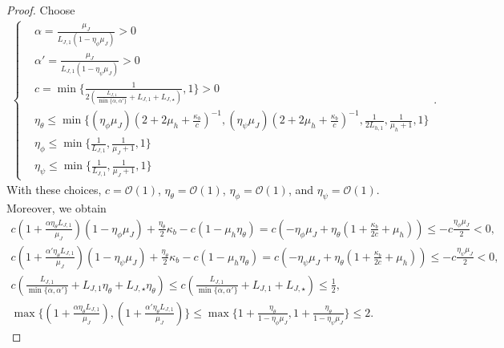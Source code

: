 \documentclass{article}
\theoremstyle{plain}
\theoremstyle{definition}
\theoremstyle{remark}
\def\cO{\mathcal O}
\begin{document}
\begin{proof}
    Choose
    \begin{align} 
        \begin{cases}
            & \alpha  = \frac{\mu_J}{L_{J,1}(1 - \eta_\phi \mu_J)} > 0  \\
            & \alpha' = \frac{\mu_J}{L_{J,1}(1 - \eta_\psi \mu_J)} > 0 \\
            & c = \min\{\frac{1}{2\left( \frac{L_{J,1}}{\min \{\alpha,\alpha'\}} + L_{J,1}  + L_{J,\star} \right)},1 \} > 0 \\
            & \eta_\theta \leq \min \{(\eta_\phi \mu_J)(2+ 2 \mu_h + \frac{\kappa_b}{c})^{-1} , (\eta_\psi \mu_J)(2 + 2 \mu_h + \frac{\kappa_b}{c})^{-1}, \frac{1}{2L_{h,1}}, \frac{1}{\mu_h+1}, 1 \} \\
            & \eta_\phi \leq \min\{\frac{1}{L_{J,1}}, \frac{1}{\mu_J + 1}, 1\}\\
            & \eta_\psi \leq \min\{\frac{1}{L_{J,1}}, \frac{1}{\mu_J+ 1}, 1\}
        \end{cases}.
        \label{eq: alg-2-stochastic-parameter-choice}
    \end{align}
With these choices, $c=\cO(1)$, $\eta_\theta=\cO(1)$,
$\eta_\phi=\cO(1)$, and $\eta_\psi=\cO(1)$. Moreover, we obtain \begin{gather}
        c\left( 1 +\frac{\alpha \eta_\theta L_{J,1}}{\mu_J} \right)\left(1 - \eta_\phi \mu_J\right) + \frac{\eta_\theta}{2}\kappa_b -  c(1 - \mu_h \eta_\theta) = c \left(- \eta_\phi \mu_J + \eta_\theta\left( 1+ \frac{\kappa_b}{2c}+ \mu_h\right)\right) \leq - c \frac{\eta_\phi\mu_J}{2} < 0 , \\ 
        c\left( 1 +\frac{\alpha' \eta_\theta L_{J,1}}{\mu_J} \right)\left(1 - \eta_\psi \mu_J\right) + \frac{\eta_\theta}{2}\kappa_b -  c(1 - \mu_h \eta_\theta) = c \left(- \eta_\psi \mu_J + \eta_\theta\left( 1+ \frac{\kappa_b}{2c}+ \mu_h\right)\right) \leq - c \frac{\eta_\psi\mu_J}{2} < 0 , \\
         c \left( \frac{L_{J,1}}{\min \{\alpha,\alpha'\}} + L_{J,1} \eta_\theta + L_{J,\star} \eta_\theta \right)\leq c \left( \frac{L_{J,1}}{\min \{\alpha,\alpha'\}} + L_{J,1}  + L_{J,\star}  \right) \leq \frac{1}{2} ,  \\
         \max \{\left( 1 +\frac{\alpha \eta_\theta L_{J,1}}{\mu_J} \right), \left( 1 +\frac{\alpha' \eta_\theta L_{J,1}}{\mu_J} \right) \}\leq \max \{1 + \frac{\eta_\theta}{1 - \eta_\phi\mu_J},1 + \frac{\eta_\theta}{1 - \eta_\psi\mu_J}  \} \leq 2 . \label{eq: upper-bound-of-max-alpha-large-batch}
    \end{gather}



\end{proof}
\end{document}
